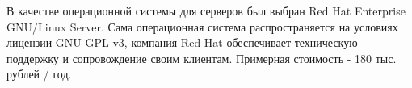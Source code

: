 В качестве операционной системы для серверов был выбран Red Hat Enterprise GNU/Linux Server. Сама операционная система распространяется на условиях лицензии GNU GPL v3, компания Red Hat обеспечивает техническую поддержку и сопровождение своим клиентам.
Примерная стоимость - 180 тыс. рублей / год.